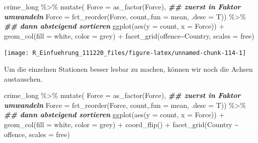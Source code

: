 \documentclass[
]{book}
\newenvironment{Shaded}{\begin{snugshade}}{\end{snugshade}}
\newcommand{\AttributeTok}[1]{\textcolor[rgb]{0.77,0.63,0.00}{#1}}
\newcommand{\DocumentationTok}[1]{\textcolor[rgb]{0.56,0.35,0.01}{\textbf{\textit{#1}}}}
\newcommand{\FunctionTok}[1]{\textcolor[rgb]{0.00,0.00,0.00}{#1}}
\newcommand{\NormalTok}[1]{#1}
\newcommand{\SpecialCharTok}[1]{\textcolor[rgb]{0.00,0.00,0.00}{#1}}
\newcommand{\StringTok}[1]{\textcolor[rgb]{0.31,0.60,0.02}{#1}}
\begin{document}
\begin{Shaded}
\begin{Highlighting}[]
\NormalTok{crime\_long }\SpecialCharTok{\%\textgreater{}\%} 
  \FunctionTok{mutate}\NormalTok{(}
      \AttributeTok{Force =} \FunctionTok{as\_factor}\NormalTok{(Force), }\DocumentationTok{\#\# zuerst in Faktor umwandeln}
      \AttributeTok{Force =} \FunctionTok{fct\_reorder}\NormalTok{(Force, count,}\AttributeTok{.fun =}\NormalTok{ mean, }\AttributeTok{.desc =}\NormalTok{ T)) }\SpecialCharTok{\%\textgreater{}\%} \DocumentationTok{\#\# dann absteigend sortieren}
\FunctionTok{ggplot}\NormalTok{(}\FunctionTok{aes}\NormalTok{(}\AttributeTok{y =}\NormalTok{ count,}
             \AttributeTok{x =}\NormalTok{ Force)) }\SpecialCharTok{+}
  \FunctionTok{geom\_col}\NormalTok{(}\AttributeTok{fill =} \StringTok{\textquotesingle{}white\textquotesingle{}}\NormalTok{,}
           \AttributeTok{color =} \StringTok{\textquotesingle{}grey\textquotesingle{}}\NormalTok{) }\SpecialCharTok{+}
  \FunctionTok{facet\_grid}\NormalTok{(offence}\SpecialCharTok{\textasciitilde{}}\NormalTok{Country, }
             \AttributeTok{scales =} \StringTok{\textquotesingle{}free\textquotesingle{}}\NormalTok{)}
\end{Highlighting}
\end{Shaded}

\begin{center}\texttt{[image: R\_Einfuehrung\_111220\_files/figure-latex/unnamed-chunk-114-1]} \end{center}

Um die einzelnen Stationen besser lesbar zu machen, können wir noch die Achsen austauschen.

\begin{Shaded}
\begin{Highlighting}[]
\NormalTok{crime\_long }\SpecialCharTok{\%\textgreater{}\%} 
  \FunctionTok{mutate}\NormalTok{(}
      \AttributeTok{Force =} \FunctionTok{as\_factor}\NormalTok{(Force), }\DocumentationTok{\#\# zuerst in Faktor umwandeln}
      \AttributeTok{Force =} \FunctionTok{fct\_reorder}\NormalTok{(Force, count,}\AttributeTok{.fun =}\NormalTok{ mean, }\AttributeTok{.desc =}\NormalTok{ T)) }\SpecialCharTok{\%\textgreater{}\%} \DocumentationTok{\#\# dann absteigend sortieren}
\FunctionTok{ggplot}\NormalTok{(}\FunctionTok{aes}\NormalTok{(}\AttributeTok{y =}\NormalTok{ count,}
             \AttributeTok{x =}\NormalTok{ Force)) }\SpecialCharTok{+}
  \FunctionTok{geom\_col}\NormalTok{(}\AttributeTok{fill =} \StringTok{\textquotesingle{}white\textquotesingle{}}\NormalTok{,}
           \AttributeTok{color =} \StringTok{\textquotesingle{}grey\textquotesingle{}}\NormalTok{) }\SpecialCharTok{+}
  \FunctionTok{coord\_flip}\NormalTok{() }\SpecialCharTok{+}
  \FunctionTok{facet\_grid}\NormalTok{(Country }\SpecialCharTok{\textasciitilde{}}\NormalTok{ offence, }
             \AttributeTok{scales =} \StringTok{\textquotesingle{}free\textquotesingle{}}\NormalTok{)}
\end{Highlighting}
\end{Shaded}
\end{document}
